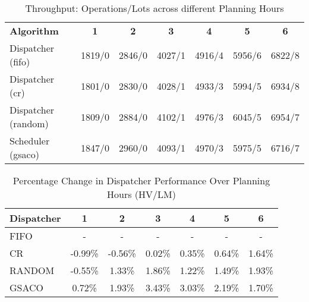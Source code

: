 \begin{table}[t]
	\caption{Throughput: Operations/Lots across different Planning Hours} \label{tab:my_label} \centering
	\begin{tabular}{|l|c|c|c|c|c|c|}
		\hline
		\textbf{Algorithm} & \textbf{1} & \textbf{2} & \textbf{3} & \textbf{4} & \textbf{5} & \textbf{6} \\ \cline{1-7} 
		Dispatcher (fifo)   & 1819/0 & 2846/0 & 4027/1 & 4916/4 & 5956/6 & 6822/8 \\
		Dispatcher (cr)     & 1801/0 & 2830/0 & 4028/1 & 4933/3 & 5994/5 & 6934/8 \\
		Dispatcher (random) & 1809/0 & 2884/0 & 4102/1 & 4976/3 & 6045/5 & 6954/7 \\
		Scheduler (gsaco)   & 1847/0 & 2960/0 & 4093/1 & 4970/3 & 5975/5 & 6716/7 \\
		\hline 
	\end{tabular}
\end{table}


\begin{table}[t]
	\caption{Percentage Change in Dispatcher Performance Over Planning Hours (HV/LM)} \label{tab:dispatchers} \centering
	\begin{tabular}{|l|c|c|c|c|c|c|}
		\hline
		\textbf{Dispatcher} & \textbf{1} & \textbf{2} & \textbf{3} & \textbf{4} & \textbf{5} & \textbf{6} \\
		\hline 
		FIFO     & -    & -    & -    & -    & -    & -    \\
		CR       & -0.99\% & -0.56\% & 0.02\% & 0.35\% & 0.64\% & 1.64\% \\
		RANDOM   & -0.55\% & 1.33\% & 1.86\% & 1.22\% & 1.49\% & 1.93\% \\
		GSACO    & 0.72\% & 1.93\% & 3.43\% & 3.03\% & 2.19\% & 1.70\% \\
		\hline
	\end{tabular}
\end{table}